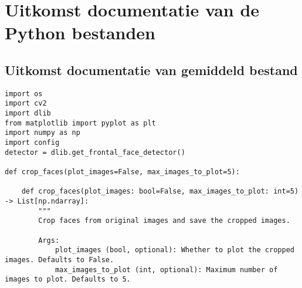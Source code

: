 \section{Uitkomst documentatie van de Python bestanden}

\subsection{Uitkomst documentatie van gemiddeld bestand}
\label{bijlage:uitkomst-gemiddeld}

\begin{verbatim}
import os
import cv2
import dlib
from matplotlib import pyplot as plt
import numpy as np
import config
detector = dlib.get_frontal_face_detector()

def crop_faces(plot_images=False, max_images_to_plot=5):

    def crop_faces(plot_images: bool=False, max_images_to_plot: int=5) -> List[np.ndarray]:
        """
        Crop faces from original images and save the cropped images.

        Args:
            plot_images (bool, optional): Whether to plot the cropped images. Defaults to False.
            max_images_to_plot (int, optional): Maximum number of images to plot. Defaults to 5.
        

\end{verbatim}
